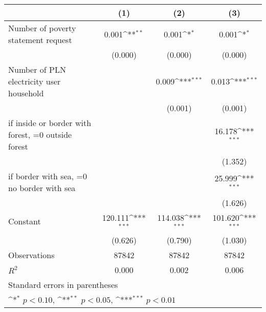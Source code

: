 {
\def\sym#1{\ifmmode^{#1}\else\(^{#1}\)\fi}
\begin{tabular}{l*{3}{c}}
\toprule
                    &\multicolumn{1}{c}{(1)}         &\multicolumn{1}{c}{(2)}         &\multicolumn{1}{c}{(3)}         \\
\midrule
Number of poverty statement request&       0.001\sym{**} &       0.001\sym{*}  &       0.001\sym{*}  \\
                    &     (0.000)         &     (0.000)         &     (0.000)         \\
\addlinespace
Number of PLN electricity user household&                     &       0.009\sym{***}&       0.013\sym{***}\\
                    &                     &     (0.001)         &     (0.001)         \\
\addlinespace
=1 if inside or border with forest, =0 outside forest&                     &                     &      16.178\sym{***}\\
                    &                     &                     &     (1.352)         \\
\addlinespace
=1 if border with sea, =0 no border with sea&                     &                     &      25.999\sym{***}\\
                    &                     &                     &     (1.626)         \\
\addlinespace
Constant            &     120.111\sym{***}&     114.038\sym{***}&     101.620\sym{***}\\
                    &     (0.626)         &     (0.790)         &     (1.030)         \\
\midrule
Observations        &       87842         &       87842         &       87842         \\
\(R^{2}\)           &       0.000         &       0.002         &       0.006         \\
\bottomrule
\multicolumn{4}{l}{\footnotesize Standard errors in parentheses}\\
\multicolumn{4}{l}{\footnotesize \sym{*} \(p<0.10\), \sym{**} \(p<0.05\), \sym{***} \(p<0.01\)}\\
\end{tabular}
}
